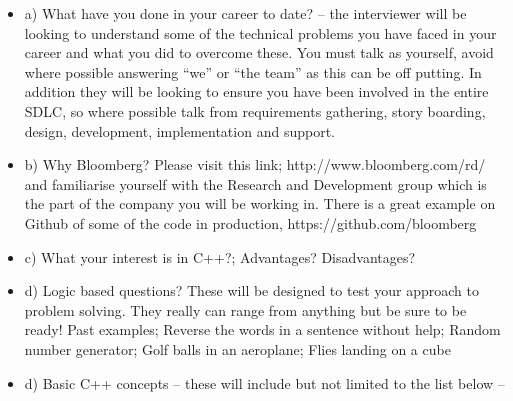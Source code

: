 \documentclass[a4paper, 10pt]{article}
\begin{document}
\begin{itemize}
\item a) What have you done in your career to date? – the interviewer will be looking to understand some of the technical problems you have faced in your career and what you did to overcome these. You must talk as yourself, avoid where possible answering “we” or “the team” as this can be off putting. In addition they will be looking to ensure you have been involved in the entire SDLC, so where possible talk from requirements gathering, story boarding, design, development, implementation and support.
\item b) Why Bloomberg? Please visit this link; http://www.bloomberg.com/rd/ and familiarise yourself with the Research and Development group which is the part of the company you will be working in. There is a great example on Github of some of the code in production, https://github.com/bloomberg
\item c) What your interest is in C++?; Advantages? Disadvantages?
\item d) Logic based questions? These will be designed to test your approach to problem solving. They really can range from anything but be sure to be ready! Past examples; Reverse the words in a sentence without help; Random number generator; Golf balls in an aeroplane; Flies landing on a cube
\item d) Basic C++ concepts – these will include but not limited to the list below –
\end{itemize}
\end{document}

